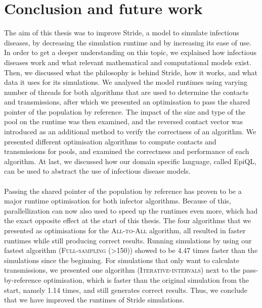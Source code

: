 \chapter{Conclusion and future work}
The aim of this thesis was to improve Stride, a model to simulate infectious diseases, by decreasing the simulation runtime and by increasing its ease of use. In order to get a deeper understanding on this topic, we explained how infectious diseases work and what relevant mathematical and computational models exist. Then, we discussed what the philosophy is behind Stride, how it works, and what data it uses for its simulations. We analysed the model runtimes using varying number of threads for both algorithms that are used to determine the contacts and transmissions, after which we presented an optimisation to pass the shared pointer of the population by reference. The impact of the size and type of the pool on the runtime was then examined, and the reversed contact vector was introduced as an additional method to verify the correctness of an algorithm. We presented different optimisation algorithms to compute contacts and transmissions for pools, and examined the correctness and performance of each algorithm. At last, we discussed how our domain specific language, called EpiQL, can be used to abstract the use of infectious disease models.
\\\\
Passing the shared pointer of the population by reference has proven to be a major runtime optimisation for both infector algorithms. Because of this, parallellization can now also used to speed up the runtimes even more, which had the exact opposite effect at the start of this thesis. The four algorithms that we presented as optimisations for the \textsc{All-to-All} algorithm, all resulted in faster runtimes while still producing correct results. Running simulations by using our fastest algorithm (\textsc{Full-sampling (>150)}) showed to be 4.47 times faster than the simulations since the beginning. For simulations that only want to calculate transmissions, we presented one algorithm (\textsc{Iterative-intervals}) next to the pass-by-reference optimisation, which is faster than the original simulation from the start, namely 1.14 times, and still generates correct results. Thus, we conclude that we have improved the runtimes of Stride simulations.
\\\\
